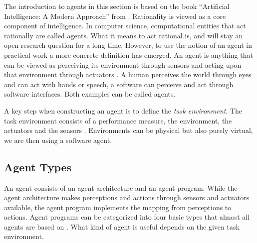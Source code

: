 \documentclass[../main.tex]{subfiles}
\begin{document}
The introduction to agents in this section is based on the book
``Artificial Intelligence: A Modern Approach'' from \citeauthor{Russel2022} \cite{Russel2022}.
Rationality is viewed as a core component of intelligence.
In computer science, computational entities that act rationally are called agents.
What it means to act rational is, and will stay an open research question for a long time.
However, to use the notion of an agent in practical work a more concrete definition has emerged.
An agent is anything that can be viewed as perceiving its environment through sensors
and acting upon that environment through actuators \cite{Russel2022}.
A human perceives the world through eyes and can act with hands or speech,
a software can perceive and act through software interfaces.
Both examples can be called agents.

A key step when constructing an agent is to define the \emph{task environment}.
The task environment consists of a performance measure, the environment, the actuators and the sensors \cite{Russel2022}.
Environments can be physical but also purely virtual, we are then using a software agent.

\subsection{Agent Types}

An agent consists of an agent architecture and an agent program.
While the agent architecture makes perceptions and actions through sensors and actuators available,
the agent program implements the mapping from perceptions to actions.
Agent programs can be categorized into four basic types that almost all agents are based on \cite{Russel2022}.
What kind of agent is useful depends on the given task environment.
\end{document}
